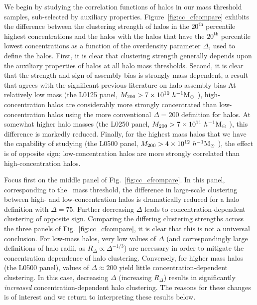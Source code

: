 \documentclass[usenatbib,usegraphicx,letterpaper]{mn2e}
\begin{document}
We begin by studying the correlation functions of halos in our mass threshold samples, sub-selected by auxiliary properties. 
Figure~\ref{fig:cc_cfcompare} exhibits the difference between the clustering strength of halos in the $20^{\mathrm{th}}$ percentile highest concentrations and the halos with the halos that have the $20^{\mathrm{th}}$ percentile lowest concentrations as a function of the overdensity parameter $\Delta$, used to define the halos. First, it is clear that clustering strength generally depends upon the auxiliary properties of halos at all halo mass thresholds. Second, it is clear that the strength and sign of assembly bias is 
strongly mass dependent, a result that agrees with the significant previous literature on halo assembly bias \citep{wechsler02, gao05, zentner07, wechsler06, harker06, croton07, dalal08} At relatively low mass (the L0125 panel, 
$M_{200} > 7 \times 10^{10} \ h^{-1}\mathrm{M}_{\odot}~$), high-concentration halos are considerably more strongly concentrated 
than low-concentration halos using the more 
conventional $\Delta = 200$ definition for halos. At somewhat higher halo masses (the L0250 panel, $M_{200} > 7 \times 10^{11} \ h^{-1}\mathrm{M}_{\odot}~$), this 
difference is markedly reduced. Finally, for the highest mass halos that we have the capability of studying (the L0500 panel, 
$M_{200} > 4 \times 10^{12} \ h^{-1}\mathrm{M}_{\odot}~$), the effect is of opposite sign; low-concentration halos are more strongly correlated than high-concentration halos.

Focus first on the middle panel of Fig.~\ref{fig:cc_cfcompare}. In this panel, corresponding to the 
\simB~mass threshold, the difference in large-scale clustering between high- and low-concentration halos 
is dramatically reduced for a halo definition with $\Delta=75$. Further decreasing $\Delta$ leads to concentration-dependent 
clustering of opposite sign. Comparing the differing clustering 
strengths across the three panels of Fig.~\ref{fig:cc_cfcompare}, it is clear that this is not a universal conclusion. 
For low-mass halos, very low values of $\Delta$ (and correspondingly large definitions of halo radii, as $R_{\Delta} \propto \Delta^{-1/3}$) 
are necessary in order to mitigate the concentration dependence of halo clustering. Conversely, for higher mass halos (the L0500 panel), 
values of $\Delta \approx 200$ yield little concentration-dependent clustering. In this case, decreasing $\Delta$ (increasing $R_{\Delta}$) results in significantly {\em increased} concentration-dependent halo clustering. The reasons for these changes is of interest and we return to interpreting these results below.
\end{document}
